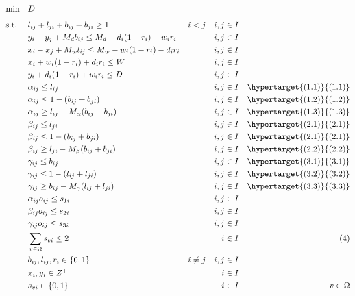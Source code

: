 \begin{equation*}
	\begin{aligned}
		& \underset{}{\text{min}}
		& & D \\
		& \text{s.t.} & &  l_{ij} + l_{ji} + b_{ij} + b_{ji} \geq 1 & i < j && i,j \in I \\
		& & & y_i - y_j + M_d b_{ij} \leq M_d - d_i (1 - r_i) - w_i r_i & & & i,j \in I \\
		& & & x_i - x_j + M_w l_{ij} \leq M_w - w_i (1 - r_i) - d_i r_i & & & i,j \in I \\
		& & & x_i + w_i (1 - r_i) + d_i r_i \leq W & & & i,j \in I \\
		& & & y_i + d_i (1 - r_i) + w_i r_i \leq D & & & i,j \in I \\
		  &   &   & \alpha_{ij} \leq l_{ij}                             &   &   & i,j \in I &   & \hypertarget{(1.1)}{(1.1)} \\
		  &   &   & \alpha_{ij} \leq 1 - (b_{ij} + b_{ji})              &   &   & i,j \in I &   & \hypertarget{(1.2)}{(1.2)} \\
		  &   &   & \alpha_{ij} \geq l_{ij} - M_\alpha(b_{ij} + b_{ji}) &   &   & i,j \in I &   & \hypertarget{(1.3)}{(1.3)} \\
		  &   &   & \beta_{ij} \leq l_{ji}                              &   &   & i,j \in I &   & \hypertarget{(2.1)}{(2.1)} \\
		  &   &   & \beta_{ij} \leq 1 - (b_{ij} + b_{ji})               &   &   & i,j \in I &   & \hypertarget{(2.1)}{(2.1)} \\
		  &   &   & \beta_{ij} \geq l_{ji} - M_\beta(b_{ij} + b_{ji})   &   &   & i,j \in I &   & \hypertarget{(2.2)}{(2.2)} \\
		  &   &   & \gamma_{ij} \leq b_{ij}                             &   &   & i,j \in I &   & \hypertarget{(3.1)}{(3.1)} \\
		  &   &   & \gamma_{ij} \leq 1 - (l_{ij} + l_{ji})              &   &   & i,j \in I &   & \hypertarget{(3.2)}{(3.2)} \\
		  &   &   & \gamma_{ij} \geq b_{ij} - M_\gamma(l_{ij} + l_{ji}) &   &   & i,j \in I &   & \hypertarget{(3.3)}{(3.3)} \\
		& & & \alpha_{ij}o_{ij} \leq s_{1i}  & & & i,j \in I \\
		& & & \beta_{ij}o_{ij} \leq s_{2i}  & & & i,j \in I \\
		& & & \gamma_{ij}o_{ij} \leq s_{3i}  & & & i,j \in I \\
		  &   &   & \sum_{v \in \Omega} s_{vi} \leq 2                   &   &   & i \in I   &   & (4)                        \\
		& & & b_{ij}, l_{ij}, r_i \in \{0,1\} & i \neq j & & i,j \in I \\
		& & & x_{i}, y_{i} \in Z^{+} & & & i \in I \\
		  &   &   & s_{vi} \in \{0,1\}                                  &   &   & i \in I   &   & v\in \Omega                \\
	\end{aligned}
\end{equation*}

